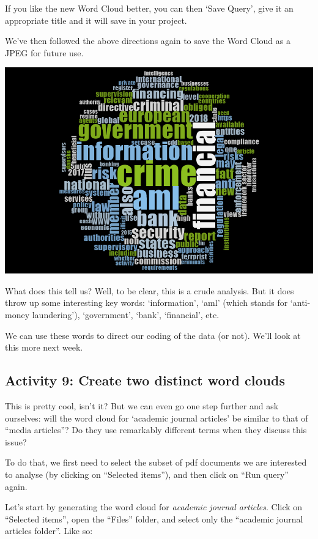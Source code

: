 \documentclass[
]{book}
\begin{document}
If you like the new Word Cloud better, you can then `Save Query', give it an appropriate title and it will save in your project.

We've then followed the above directions again to save the Word Cloud as a JPEG for future use.

\includegraphics{imgs/word_cloud4.png}

What does this tell us? Well, to be clear, this is a crude analysis. But it does throw up some interesting key words: `information', `aml' (which stands for `anti-money laundering'), `government', `bank', `financial', etc.

We can use these words to direct our coding of the data (or not). We'll look at this more next week.

\hypertarget{activity-9-create-two-distinct-word-clouds}{%
\subsection{Activity 9: Create two distinct word clouds}\label{activity-9-create-two-distinct-word-clouds}}

This is pretty cool, isn't it? But we can even go one step further and ask ourselves: will the word cloud for `academic journal articles' be similar to that of ``media articles''? Do they use remarkably different terms when they discuss this issue?

To do that, we first need to select the subset of pdf documents we are interested to analyse (by clicking on ``Selected items''), and then click on ``Run query'' again.

Let's start by generating the word cloud for \emph{academic journal articles}. Click on ``Selected items'', open the ``Files'' folder, and select only the ``academic journal articles folder''. Like so:
\end{document}
